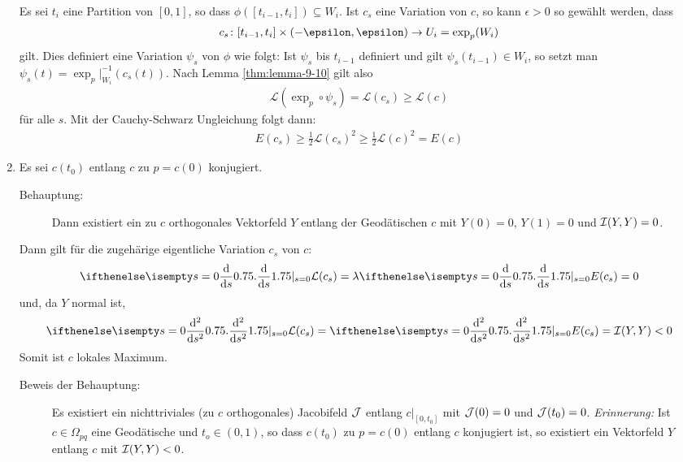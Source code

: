 \begin{bew}
\begin{enumerate}[label=(\roman*),leftmargin=*,widest=ii]
\begin{center}
\end{center}
    Es sei $t_i$ eine Partition von $[0,1]$, so dass $\phi([t_{i-1},t_i]) \subseteq W_i$. Ist $c_s$ eine Variation von $c$, so kann $\epsilon > 0$ so gewählt werden, dass
    \begin{align*}
      c_s \colon [t_{i-1},t_i]\X(-\epsilon,\epsilon) \to U_i = \exp_p(W_i)
    \end{align*}
    gilt. Dies definiert eine Variation $\psi_s$ von $\phi$ wie folgt:
    Ist $\psi_s$ bis $t_{i-1}$ definiert und gilt $\psi_s(t_{i-1}) \in W_i$, so setzt man $\psi_s(t) = \exp_p|_{W_i}^{-1}(c_s(t))$.
    Nach Lemma \ref{thm:lemma-9-10} gilt also
    \begin{align*}
      \mathcal L(\exp_p\circ \psi_s) = \mathcal L(c_s) \geq \mathcal L(c)
    \end{align*}
    für alle $s$. Mit der Cauchy-Schwarz Ungleichung folgt dann:
    \begin{align*}
      E(c_s) \geq \frac{1}{2} \mathcal L(c_s)^2 \geq \frac{1}{2} \mathcal
      L(c)^2 = E(c)
    \end{align*}
  \item
    Es sei $c(t_0)$ entlang $c$ zu $p = c(0)$ konjugiert.
    
    \begin{description}\item[Behauptung:] Dann existiert ein zu $c$ orthogonales Vektorfeld $Y$ entlang der Geodätischen $c$ mit $Y(0) = 0$, $Y(1) = 0$ und $\operatorname{\mathcal{I}}(Y,Y) = 0$.\end{description}
    Dann gilt für die zugehärige eigentliche Variation $c_s$ von $c$:
    \begin{align*}
      \difffrac[s=0]{}{s}\mathcal L(c_s) = \lambda
      \difffrac[s=0]{}{s}E(c_s) = 0
    \end{align*}
    und, da $Y$ normal ist,
    \begin{align*}
      \difffrac[s=0]{^2}{s^2}\mathcal L(c_s) = \difffrac[s=0]{^2}{s^2}
      E(c_s) = \calI(Y,Y) < 0
    \end{align*}
    Somit ist $c$ lokales Maximum.
    \begin{description}\item[Beweis der Behauptung:]
      Es existiert ein nichttriviales (zu $c$ orthogonales) Jacobifeld $\operatorname{\mathcal{J}}$ entlang $c|_{[0,t_0]}$ mit $\operatorname{\mathcal{J}}(0) = 0$ und $\operatorname{\mathcal{J}}(t_0) = 0$.
    \emph{Erinnerung:} Ist $c \in \Omega_{pq}$ eine Geodätische und $t_o \in (0,1)$, so dass $c(t_0)$ zu $p = c(0)$ entlang $c$ konjugiert ist, so existiert ein Vektorfeld $Y$ entlang $c$ mit $\operatorname{\mathcal{I}}(Y,Y) < 0$.


\end{description}
\end{enumerate}
\end{bew}
